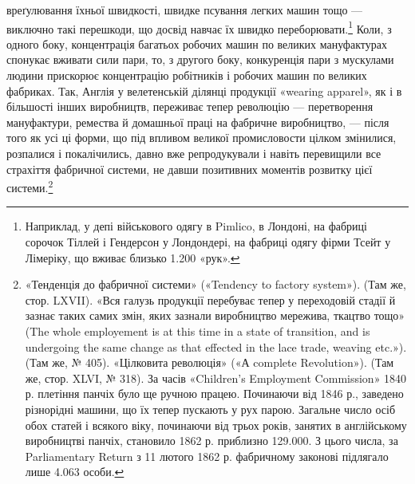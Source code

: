 \parcont{}  %
вреґулювання їхньої швидкості, швидке псування легких машин
тощо — виключно такі перешкоди, що досвід навчає їх швидко
переборювати.\footnote{
Наприклад, у депі військового одягу в Pimlico, в Лондоні, на
фабриці сорочок Тіллей і Гендерсон у Лондондері, на фабриці одягу фірми
Тсейт у Лімеріку, що вживає близько 1.200 «рук».
} Коли, з одного боку, концентрація багатьох
робочих машин по великих мануфактурах спонукає вживати сили
пари, то, з другого боку, конкуренція пари з мускулами людини
прискорює концентрацію робітників і робочих машин по великих
фабриках. Так, Англія у велетенській ділянці продукції «wearing
apparel», як і в більшості інших виробництв, переживає тепер
революцію — перетворення мануфактури, ремества й домашньої
праці на фабричне виробництво, — після того як усі ці форми,
що під впливом великої промисловости цілком змінилися,
розпалися і покалічились, давно вже репродукували і навіть
перевищили все страхіття фабричної системи, не давши позитивних
моментів розвитку цієї системи.\footnote{
«Тенденція до фабричної системи» («Tendency to factory system»).
(Там же, стор. LXVII). «Вся галузь продукції перебуває тепер у переходовій
стадії й зазнає таких самих змін, яких зазнали виробництво мережива,
ткацтво тощо» (The whole employement is at this time in a state
of transition, and is undergoing the same change as that effected in the
lace trade, weaving etc.»). (Там же, № 405). «Цілковита революція» («А
complete Revolution»). (Там же, стор. XLVI, № 318). За часів «Children’s
Employment Commission» 1840 р. плетіння панчіх було ще ручною
працею. Починаючи від 1846 р., заведено різнорідні машини, що їх тепер
пускають у рух парою. Загальне число осіб обох статей і всякого
віку, починаючи від трьох років, занятих в англійському виробництві
панчіх, становило 1862 р. приблизно 129.000. З цього числа, за Parliamentary
Return з 11 лютого 1862 р. фабричному законові підлягало
лише 4.063 особи.
}

